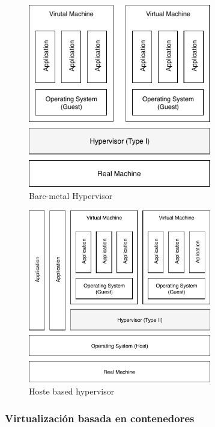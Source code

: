 \begin{figure}[!hbtp]
	\centering
	\includegraphics[width=8cm]{Pictures/bare-metalHypervisor.pdf}
	\vspace{-0.2cm}
	\caption{Bare-metal Hypervisor}
	\label{fig:Bare-metalHypervisor}
\end{figure}

\begin{figure}[ht] %
	\centering
	\includegraphics[width=8cm]{Pictures/host-basedHypervisor.pdf}
	\vspace{-0.2cm}
	\caption{Hoste based hypervisor}
	\label{fig:host-basedHypervisor}
\end{figure}

\subsubsection{Virtualización basada en contenedores}


